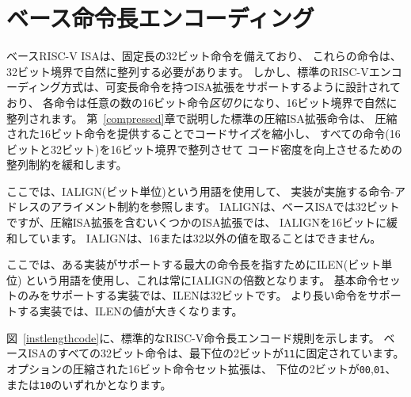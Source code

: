 \section{ベース命令長エンコーディング}

ベースRISC-V ISAは、固定長の32ビット命令を備えており、
これらの命令は、32ビット境界で自然に整列する必要があります。
しかし、標準のRISC-Vエンコーディング方式は、可変長命令を持つISA拡張をサポートするように設計されており、
各命令は任意の数の16ビット命令{\em 区切り}になり、16ビット境界で自然に整列されます。
第~\ref{compressed}章で説明した標準の圧縮ISA拡張命令は、
圧縮された16ビット命令を提供することでコードサイズを縮小し、
すべての命令(16ビットと32ビット)を16ビット境界で整列させて
コード密度を向上させるための整列制約を緩和します。

ここでは、IALIGN(ビット単位)という用語を使用して、
実装が実施する命令-アドレスのアライメント制約を参照します。
IALIGNは、ベースISAでは32ビットですが、圧縮ISA拡張を含むいくつかのISA拡張では、
IALIGNを16ビットに緩和しています。
IALIGNは、16または32以外の値を取ることはできません。

ここでは、ある実装がサポートする最大の命令長を指すためにILEN(ビット単位)
という用語を使用し、これは常にIALIGNの倍数となります。
基本命令セットのみをサポートする実装では、ILENは32ビットです。
より長い命令をサポートする実装では、ILENの値が大きくなります。

図~\ref{instlengthcode}に、標準的なRISC-V命令長エンコード規則を示します。
ベースISAのすべての32ビット命令は、最下位の2ビットが{\tt 11}に固定されています。
オプションの圧縮された16ビット命令セット拡張は、
下位の2ビットが{\tt 00},{\tt 01}、または{\tt 10}のいずれかとなります。

